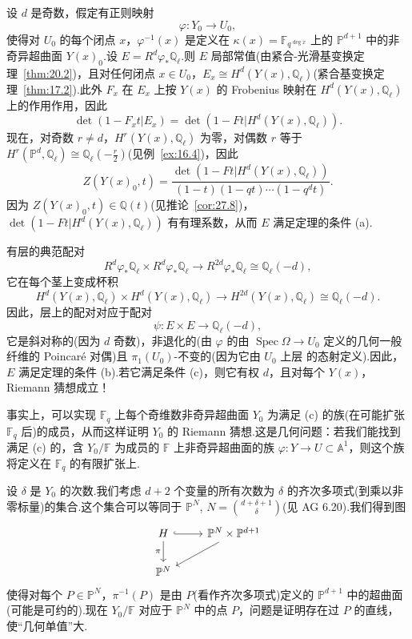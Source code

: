 \begin{example}\label{ex:30.7}
设 $d$ 是奇数，假定有正则映射
\[
\varphi \colon Y_0 \to U_0,
\]
使得对 $U_0$ 的每个闭点 $x$，$\varphi^{-1}(x)$ 是定义在 $\kappa(x) = \mathbb{F}_{q^{\deg x}}$ 上的 $\mathbb{P}^{d+1}$ 中的非奇异超曲面 $Y(x)_0$.设 $E = R^{d}\varphi_{*}\mathbb{Q}_{\ell}$.则 $E$ 局部常值(由紧合-光滑基变换定理~\ref{thm:20.2})，且对任何闭点 $x \in U_0$，$E_x \cong H^{d}(Y(x), \mathbb{Q}_{\ell})$(紧合基变换定理~\ref{thm:17.2}).此外 $F_x$ 在 $E_x$ 上按 $Y(x)$ 的 Frobenius 映射在 $H^{d}(Y(x), \mathbb{Q}_{\ell})$ 上的作用作用，因此
\[
\det(1 - F_x t|E_x) = \det(1 - Ft|H^{d}(Y(x), \mathbb{Q}_{\ell})).
\]
现在，对奇数 $r \neq d$，$H^{r}(Y(x), \mathbb{Q}_{\ell})$ 为零，对偶数 $r$ 等于 $H^{r}(\mathbb{P}^{d}, \mathbb{Q}_{\ell}) \cong \mathbb{Q}_{\ell}(-\frac{r}{2})$(见例~\ref{ex:16.4})，因此
\[
Z(Y(x)_0, t) = \frac{\det(1 - Ft|H^{d}(Y(x), \mathbb{Q}_{\ell}))}{(1 - t)(1 - qt) \cdots (1 - q^{d}t)}.
\]
因为 $Z(Y(x)_0, t) \in \mathbb{Q}(t)$(见推论~\ref{cor:27.8})，$\det(1 - Ft|H^{d}(Y(x), \mathbb{Q}_{\ell}))$ 有有理系数，从而 $E$ 满足定理的条件 (a).

有层的典范配对
\[
R^{d}\varphi_{*}\mathbb{Q}_{\ell} \times R^{d}\varphi_{*}\mathbb{Q}_{\ell} \to R^{2d}\varphi_{*}\mathbb{Q}_{\ell} \cong \mathbb{Q}_{\ell}(-d),
\]
它在每个茎上变成杯积
\[
H^{d}(Y(x), \mathbb{Q}_{\ell}) \times H^{d}(Y(x), \mathbb{Q}_{\ell}) \to H^{2d}(Y(x), \mathbb{Q}_{\ell}) \cong \mathbb{Q}_{\ell}(-d).
\]
因此，层上的配对对应于配对
\[
\psi \colon E \times E \to \mathbb{Q}_{\ell}(-d),
\]
它是斜对称的(因为 $d$ 奇数)，非退化的(由 $\varphi$ 的由 $\operatorname{Spec} \Omega \to U_0$ 定义的几何一般纤维的 Poincar\'e 对偶)且 $\pi_1(U_0)$-不变的(因为它由 $U_0$ 上层 的态射定义).因此，$E$ 满足定理的条件 (b).若它满足条件 (c)，则它有权 $d$，且对每个 $Y(x)$，Riemann 猜想成立！

事实上，可以实现 $\mathbb{F}_q$ 上每个奇维数非奇异超曲面 $Y_0$ 为满足 (c) 的族(在可能扩张 $\mathbb{F}_q$ 后)的成员，从而这样证明 $Y_0$ 的 Riemann 猜想.这是几何问题：若我们能找到满足 (c) 的，含 $Y_0/\mathbb{F}$ 为成员的 $\mathbb{F}$ 上非奇异超曲面的族 $\varphi \colon Y \to U \subset \mathbb{A}^{1}$，则这个族将定义在 $\mathbb{F}_q$ 的有限扩张上.

设 $\delta$ 是 $Y_0$ 的次数.我们考虑 $d + 2$ 个变量的所有次数为 $\delta$ 的齐次多项式(到乘以非零标量)的集合.这个集合可以等同于 $\mathbb{P}^{N}$, $N = \binom{d+\delta+1}{\delta}$(见 AG 6.20).我们得到图
\[
\begin{tikzcd}
H \arrow[r, hook] \arrow[d, "\pi"'] & \mathbb{P}^{N} \times \mathbb{P}^{d+1} \arrow[ld] \\
\mathbb{P}^{N}
\end{tikzcd}
\]
使得对每个 $P \in \mathbb{P}^{N}$，$\pi^{-1}(P)$ 是由 $P$(看作齐次多项式)定义的 $\mathbb{P}^{d+1}$ 中的超曲面(可能是可约的).现在 $Y_0/\mathbb{F}$ 对应于 $\mathbb{P}^{N}$ 中的点 $P$，问题是证明存在过 $P$ 的直线，使``几何单值''大.
\end{example}

